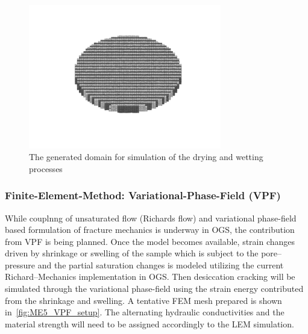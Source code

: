 \begin{figure}[!ht]
\centering
\includegraphics[width=0.75\textwidth]{figures/Amir_ME6_Lattice_Setup.png}
\caption{The generated domain for simulation of the drying and wetting processes}
\label{fig:Amir_ME6_Lattice_Setup}
\end{figure} 





\subsubsection*{Finite-Element-Method: Variational-Phase-Field (VPF)}
While couplnng of unsaturated flow (Richards flow) and variational phase-field based formulation of fracture mechanics is underway in OGS, the contribution from VPF is being planned. 
Once the model becomes available, strain changes driven by shrinkage or swelling of the sample which is subject to the pore--pressure and the partial saturation changes is modeled utilizing the current Richard--Mechanics implementation in OGS. Then desiccation cracking will be simulated through the variational phase-field using the strain energy contributed from the shrinkage and swelling.
A tentative FEM mesh prepared is shown in~\ref{fig:ME5_VPF_setup}.
The alternating hydraulic conductivities and the material strength will need to be assigned accordingly to the LEM simulation.

